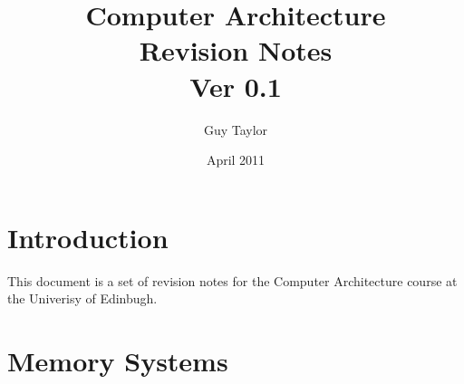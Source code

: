 \documentclass[11pt,twoside,a4paper]{article}
\begin{document}
  
  \title{Computer Architecture \\Revision Notes \\ Ver 0.1}
  \author{Guy Taylor}
  \date{April 2011}
  
  \maketitle
  
  \tableofcontents
  
  \section{Introduction}
    This document is a set of revision notes for the Computer Architecture \cite{car_home} course at the Univerisy of Edinbugh.
  
  \clearpage
  \section{Memory Systems}
        
  
  \clearpage  
  
  
\end{document}
